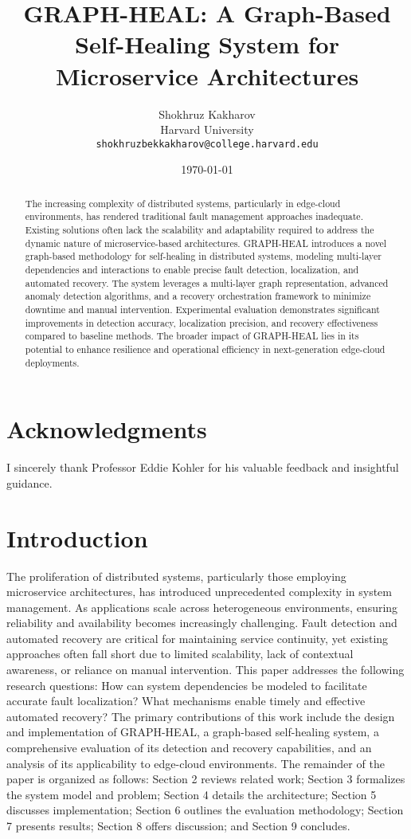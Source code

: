 \documentclass[11pt,twocolumn]{article}
\title{GRAPH-HEAL: A Graph-Based Self-Healing System for Microservice Architectures}
\author{Shokhruz Kakharov \\ Harvard University \\ \texttt{shokhruzbekkakharov@college.harvard.edu}}
\date{\today}
\begin{document}
\maketitle

\section*{Acknowledgments}
I sincerely thank Professor Eddie Kohler for his valuable feedback and insightful guidance. 
\begin{abstract}
The increasing complexity of distributed systems, particularly in edge-cloud environments, has rendered traditional fault management approaches inadequate. Existing solutions often lack the scalability and adaptability required to address the dynamic nature of microservice-based architectures. GRAPH-HEAL introduces a novel graph-based methodology for self-healing in distributed systems, modeling multi-layer dependencies and interactions to enable precise fault detection, localization, and automated recovery. The system leverages a multi-layer graph representation, advanced anomaly detection algorithms, and a recovery orchestration framework to minimize downtime and manual intervention. Experimental evaluation demonstrates significant improvements in detection accuracy, localization precision, and recovery effectiveness compared to baseline methods. The broader impact of GRAPH-HEAL lies in its potential to enhance resilience and operational efficiency in next-generation edge-cloud deployments.
\end{abstract}

\section{Introduction}
The proliferation of distributed systems, particularly those employing microservice architectures, has introduced unprecedented complexity in system management. As applications scale across heterogeneous environments, ensuring reliability and availability becomes increasingly challenging. Fault detection and automated recovery are critical for maintaining service continuity, yet existing approaches often fall short due to limited scalability, lack of contextual awareness, or reliance on manual intervention. This paper addresses the following research questions: How can system dependencies be modeled to facilitate accurate fault localization? What mechanisms enable timely and effective automated recovery? The primary contributions of this work include the design and implementation of GRAPH-HEAL, a graph-based self-healing system, a comprehensive evaluation of its detection and recovery capabilities, and an analysis of its applicability to edge-cloud environments. The remainder of the paper is organized as follows: Section 2 reviews related work; Section 3 formalizes the system model and problem; Section 4 details the architecture; Section 5 discusses implementation; Section 6 outlines the evaluation methodology; Section 7 presents results; Section 8 offers discussion; and Section 9 concludes.
\end{document}
